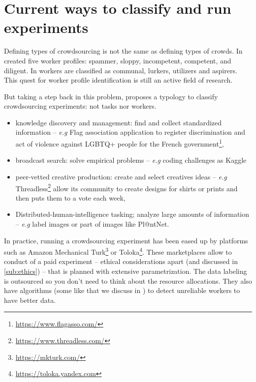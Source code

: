 \section{Current ways to classify and run experiments}
\label{sub:run-experiments}

Defining types of crowdsourcing is not the same as defining types of crowds.
In \citet{kazai2011worker} created five worker profiles: spammer, sloppy, incompetent, competent, and diligent. In \citet{martineau2012typology} workers are classified as communal, lurkers, utilizers and aspirers.
This quest for worker profile identification is still an active field of research.

But taking a step back in this problem, \citet{brabham2013crowdsourcing} proposes a typology to classify crowdsourcing experiments: not tasks nor workers.
\begin{itemize}
    \item knowledge discovery and management: find and collect standardized information -- \emph{e.g} Flag association application to register discrimination and act of violence against LGBTQ+ people for the French government\footnote{\url{https://www.flagasso.com/}},
    \item broadcast search: solve empirical problems -- \emph{e.g} coding challenges as Kaggle
    \item peer-vetted creative production: create and select creatives ideas -- \emph{e.g} Threadless\footnote{\url{https://www.threadless.com/}} allow its community to create designs for shirts or prints and then puts them to a vote each week,
    \item Distributed-human-intelligence tasking; analyze large amounts of information -- \emph{e.g} label images or part of images like Pl@ntNet.
\end{itemize}

In practice, running a crowdsourcing experiment has been eased up by platforms such as Amazon Mechanical Turk\footnote{\url{https://mkturk.com/}} or Toloka\footnote{\url{https://toloka.yandex.com}}.
These marketplaces allow to conduct of a paid experiment -- ethical considerations apart (and discussed in \cref{sub:ethics}) -- that is planned with extensive parametrization.
The data labeling is outsourced so you don't need to think about the resource allocations. They also have algorithms (some like \citet{raykar_ranking_2011} that we discuss in ) to detect unreliable workers to have better data.

